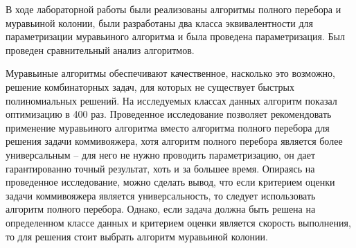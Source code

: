 В ходе лабораторной работы были реализованы алгоритмы полного перебора и муравьиной колонии, были разработаны два класса эквивалентности для параметризации муравьиного алгоритма и была проведена параметризация. Был проведен сравнительный анализ алгоритмов. 


Муравьиные алгоритмы обеспечивают качественное, насколько это возможно, решение комбинаторных задач, для которых не существует быстрых полиномиальных решений. На исследуемых классах данных алгоритм показал оптимизацию в 400 раз. Проведенное исследование позволяет рекомендовать применение муравьиного алгоритма вместо алгоритма полного перебора для решения задачи коммивояжера, хотя алгоритм полного перебора является более универсальным -- для него не нужно проводить параметризацию, он дает гарантированно точный результат, хоть и за большее время. 
Опираясь на проведенное исследование, можно сделать вывод, что если критерием оценки задачи коммивояжера является универсальность, то следует использовать алгоритм полного перебора. Однако, если задача должна быть решена на определенном классе данных и критерием оценки является скорость выполнения, то для решения стоит выбрать алгоритм муравьиной колонии. 